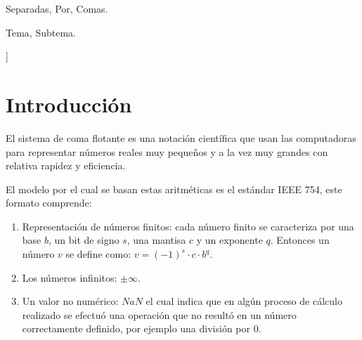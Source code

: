\documentclass[a4paper,10pt,twocolumn]{article}
\begin{document}
\begin{keywords}
	Separadas,
	Por,
	Comas.
\end{keywords}

\begin{topics}
	Tema, Subtema.
\end{topics}


\vspace{0.8cm}
]



\section{Introducción}\label{sec:intro}
	El sistema de coma flotante es una notación científica que usan las computadoras para representar números reales muy pequeños y a la vez muy grandes con relativa rapidez y eficiencia.
  
	El modelo por el cual se basan estas aritméticas es el estándar IEEE 754, este formato comprende:
	\begin{enumerate}
  
  		\item Representación de números finitos: cada número finito se caracteriza por una base $b$, un bit de signo $s$, una mantisa $c$ y un exponente $q$. Entonces un número $v$ se define como: $v=(-1)^s\cdot c\cdot b^q$. 
  	
  		\item Los números infinitos: $\pm\infty$.
  	
  		\item Un valor no numérico: $NaN$ el cual indica que en algún proceso de cálculo realizado se efectuó una operación que no resultó en un número correctamente definido, por ejemplo una división por 0.
	\end{enumerate}
  
\end{document}
